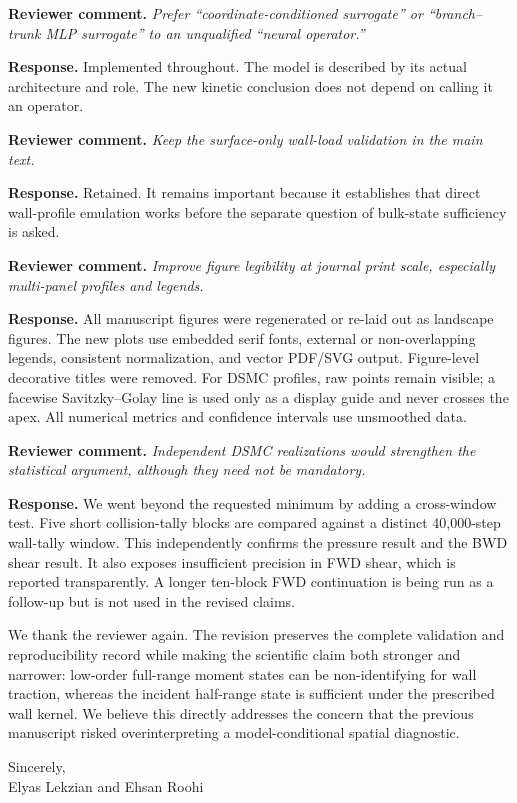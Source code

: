 \documentclass[11pt]{article}
\newcommand{\reviewer}[1]{\vspace{0.4em}\noindent\textbf{Reviewer comment.} \emph{#1}}
\newcommand{\response}{\noindent\textbf{Response.} }
\begin{document}
\reviewer{Prefer ``coordinate-conditioned surrogate'' or ``branch--trunk MLP surrogate'' to an unqualified ``neural operator.''}

\response Implemented throughout. The model is described by its actual architecture and role. The new kinetic conclusion does not depend on calling it an operator.

\reviewer{Keep the surface-only wall-load validation in the main text.}

\response Retained. It remains important because it establishes that direct wall-profile emulation works before the separate question of bulk-state sufficiency is asked.

\reviewer{Improve figure legibility at journal print scale, especially multi-panel profiles and legends.}

\response All manuscript figures were regenerated or re-laid out as landscape figures. The new plots use embedded serif fonts, external or non-overlapping legends, consistent normalization, and vector PDF/SVG output. Figure-level decorative titles were removed. For DSMC profiles, raw points remain visible; a facewise Savitzky--Golay line is used only as a display guide and never crosses the apex. All numerical metrics and confidence intervals use unsmoothed data.

\reviewer{Independent DSMC realizations would strengthen the statistical argument, although they need not be mandatory.}

\response We went beyond the requested minimum by adding a cross-window test. Five short collision-tally blocks are compared against a distinct 40,000-step wall-tally window. This independently confirms the pressure result and the BWD shear result. It also exposes insufficient precision in FWD shear, which is reported transparently. A longer ten-block FWD continuation is being run as a follow-up but is not used in the revised claims.

\vspace{0.8em}
We thank the reviewer again. The revision preserves the complete validation and reproducibility record while making the scientific claim both stronger and narrower: low-order full-range moment states can be non-identifying for wall traction, whereas the incident half-range state is sufficient under the prescribed wall kernel. We believe this directly addresses the concern that the previous manuscript risked overinterpreting a model-conditional spatial diagnostic.

Sincerely,\\
Elyas Lekzian and Ehsan Roohi
\end{document}
